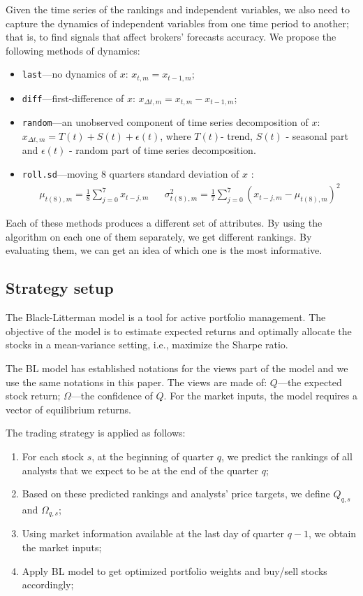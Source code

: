 \documentclass{llncs}\usepackage[]{graphicx}\usepackage[]{color}
\newcommand{\raw}{\texttt{last}}
\newcommand{\diff}{\texttt{diff}}
\newcommand{\random}{\texttt{random}}
\newcommand{\rollsd}{\texttt{roll.sd}}
\begin{document}
Given the time series of the rankings and independent variables, we also need to capture the  dynamics of independent variables from one time period to another; that is, to find signals that affect brokers' forecasts accuracy.  We propose the following methods of dynamics:
\begin{itemize}
\item \raw{}---no dynamics of $x$: $x_{t,m}=x_{t-1,m}$;
\item  \diff{}---first-difference  of $x$: $x_{\Delta{t,m}}=x_{t,m}-x_{t-1,m}$;
\item  \random{}---an unobserved component of time series decomposition of $x$: $x_{\Delta{t},m}=T(t)+S(t)+\epsilon (t)$, where $T(t)$- trend, $S(t)$ - seasonal part and $\epsilon (t)$ - random part of time series decomposition.
\item  \rollsd{}---moving 8 quarters standard deviation of $x$ \cite{zivot2003}:
\begin{align}
\mu_{t(8),m}=\frac{1}{8}\sum_{j=0}^7 x_{t-j,m}  &&\sigma^2_{t(8),m}=\frac{1}{7}\sum_{j=0}^7 \left(x_{t-j,m}-\mu_{t(8),m}\right)^2
\end{align}

\end{itemize}
Each of these methods produces a different set of attributes. By using the algorithm on each one of them separately, we get different rankings. By evaluating them, we can get an idea of which one is the most informative.

\subsection{Strategy setup}
The Black-Litterman model \cite{black1992}  is a tool for active portfolio management. The objective of the model is to estimate  expected returns and optimally allocate the stocks  in a mean-variance setting, i.e., maximize the Sharpe ratio.

The BL model has established notations for the  views part of the model and we use the same notations in this paper. The views are made of: $Q$---the expected stock return; $\Omega$---the confidence of $Q$. For the market inputs, the model requires a vector of equilibrium returns.

The trading strategy is applied as follows:
\begin{enumerate}
\item For each stock $s$, at the beginning of quarter $q$, we predict the rankings of all analysts that we expect to be at the end of the quarter $q$;
\item Based on these  predicted rankings and analysts' price targets,  we define $Q_{q,s}$ and $\Omega_{q,s}$;
\item Using market information available at the last day of quarter $q-1$, we obtain the market inputs;
\item Apply BL model to get  optimized portfolio weights and buy/sell stocks accordingly;
\end{enumerate}
\end{document}
